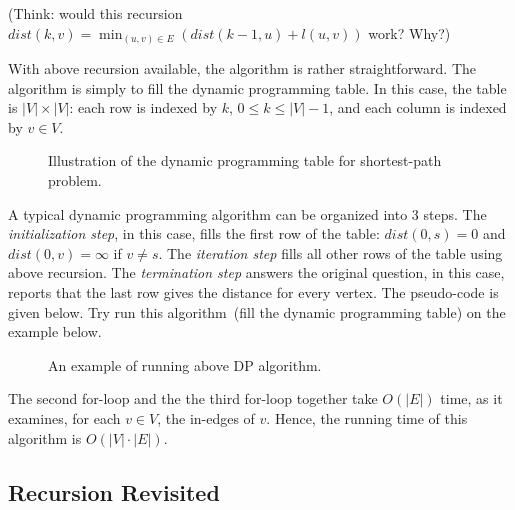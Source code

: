 (Think: would this recursion $dist(k,v) = \min_{(u,v)\in E} (dist(k-1,u) + l(u,v))$ work? Why?)

With above recursion available, the algorithm is rather straightforward.
The algorithm is simply to fill the dynamic programming table.
In this case, the table is $|V| \times |V|$: each row is indexed by $k$, $0 \le k \le |V| - 1$, 
and each column is indexed by $v\in V$. 

\begin{figure}[h]
\centering{}
\caption{Illustration of the dynamic programming table for shortest-path problem.}
\end{figure}


A typical dynamic programming algorithm can be organized into 3 steps.
The \emph{initialization step}, in this case, fills the first row of the table:
$dist(0,s) = 0$ and $dist(0,v) = \infty$ if $v\neq s$.
The \emph{iteration step} fills all other rows of the table using above recursion.
The \emph{termination step} answers the original question, in this case,
reports that the last row gives the distance for every vertex.
The pseudo-code is given below.
Try run this algorithm~(fill the dynamic programming table) on the example below.

\begin{minipage}{0.8\textwidth}
	\xxx
	\xxx
	\xxx
	\xxx
	\xxx
	\xxx
	\xxx
	\xxx
	\xxx
	\xxx
	\xxx
	\xxx
	\xxx
	\xxx
	\xxx
\end{minipage}

\begin{figure}[h]
\centering{}
\caption{An example of running above DP algorithm.}
\end{figure}


The second for-loop and the the third for-loop together take $O(|E|)$ time,
as it examines, for each $v\in V$, the in-edges of $v$.
Hence, the running time of this algorithm is $O(|V|\cdot |E|)$.

\subsection*{Recursion Revisited}

